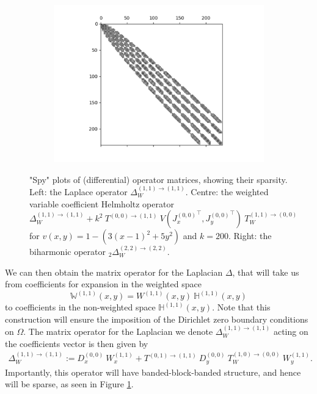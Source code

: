 \documentclass[11pt, oneside]{article}   	%
\newcommand{\hdop}{H}
\newcommand{\Wii}{W^{(1,1)}}
\newcommand{\bighdopii}{{\mathbb{\hdop}^{(1,1)}}}
\newcommand{\laplacewii}{\Delta_W^{(1,1)\to(1,1)}}
\newcommand{\biharmonic}{_2\Delta_W^{(2,2)\to(2,2)}}
\newcommand{\bigWii}{{\mathbb{W}^{(1,1)}}}
\begin{document}
\begin{figure}
\begin{subfigure}[t]{0.32\textwidth}
	\includegraphics[scale=0.35]{sparsityofbiharmonic}
	\end{subfigure}
	\centering
    	\caption{"Spy" plots of (differential) operator matrices, showing their sparsity. Left: the Laplace operator $\laplacewii$. Centre: the weighted variable coefficient Helmholtz operator $\laplacewii + k^2 \: T^{(0,0)\to(1,1)} \: V({J_x^{(0,0)}}^\top, {J_y^{(0,0)}}^\top) \: T_W^{(1,1)\to(0,0)}$ for $v(x,y) = 1 - (3(x-1)^2 + 5y^2)$ and $k = 200$. Right: the biharmonic operator $\biharmonic$.}
	\centering
        \label{fig:sparsity}
\end{figure}

We can then obtain the matrix operator for the Laplacian \(\Delta\), that will take us from coefficients for expansion in the weighted space
$$
\bigWii(x,y) = \Wii(x,y) \: \bighdopii(x,y)
$$
to coefficients in the non-weighted space $\bighdopii(x,y)$. Note that this construction will ensure the imposition of the Dirichlet zero boundary conditions on $\Omega$. The matrix operator for the Laplacian we denote $\laplacewii$ acting on the coefficients vector is then given by
\begin{align*}
    \laplacewii := D_x^{(0,0)} \: W_x^{(1,1)} + T^{(0,1)\to(1,1)} \: D_y^{(0,0)} \: T_W^{(1,0)\to(0,0)} \: W_y^{(1,1)}.
\end{align*}
Importantly, this operator will have banded-block-banded structure, and hence will be sparse, as seen in Figure \ref{fig:sparsity}.
\end{document}

